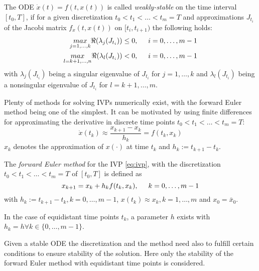 \documentclass[a4paper, 12pt]{scrreprt} %
\begin{document}
\begin{definition}
The \ac{ODE} $\dot x(t) = f\left(t,x(t)\right)$ is called \emph{weakly-stable} on the time interval $[t_0,T]$, if for a given discretization $t_0 < t_1 < \dots < t_m = T$ and approximations $J_{t_i}$ of the Jacobi matrix $f_x(t,x(t))$ on $[t_i, t_{i+1})$ the following holds:
\begin{align}
\underset{j=1,\dots,k}{max} \Re (\lambda_j(J_{t_i})) &\leq  0, \hspace{0.5cm} i=0, \dots, m-1 \\
\underset{l=k+1,\dots,n}{max} \Re (\lambda_l(J_{t_i})) &<  0, \hspace{0.5cm} i=0, \dots, m-1
\label{eq:stab2}
\end{align}
with $\lambda_j(J_{t_i})$ being a singular eigenvalue of $J_{t_i}$ for $j=1,\dots,k$ and $\lambda_l(J_{t_i})$ being a nonsingular eigenvalue of $J_{t_i}$ for $l=k+1,\dots,m$.
\end{definition}

Plenty of methods for solving \acp{IVP} numerically exist, with the forward Euler method being one of the simplest. It can be motivated by using finite differences for approximating the derivative in discrete time points $t_0 < t_1 < \dots < t_m = T$:
\begin{equation*}
\dot x(t_k) \approx \frac{x_{k+1}- x_k}{h_k} = f(t_k, x_k) 
\end{equation*}
$x_k$ denotes the approximation of $x(\cdot)$ at time $t_k$ and $h_k := t_{k+1}-t_k$.

\begin{definition}
The \emph{forward Euler method} for the \ac{IVP} \ref{eq:ivp}, with the discretization $t_0 < t_1 < \dots < t_m = T$ of $[t_0,T]$ is defined as
\begin{equation}
x_{k+1} = x_k + h_k f(t_k,x_k), \hspace{0.5cm} k=0,\dots, m-1
\label{eq:fweul}
\end{equation}
with $h_k := t_{k+1}-t_k, k=0,\dots,m-1$, $x(t_k) \approx x_k, k=1,\dots,m$ and $x_0 = \bar x_0$. 
\end{definition}

In the case of equidistant time points $t_k$, a parameter $h$ exists with $h_k = h \forall k \in \{0,\dots,m-1\}$. 

Given a stable \ac{ODE} the discretization and the method need also to fulfill certain conditions to ensure stability of the solution. Here only the stability of the forward Euler method with equidistant time points is considered.
\end{document}
